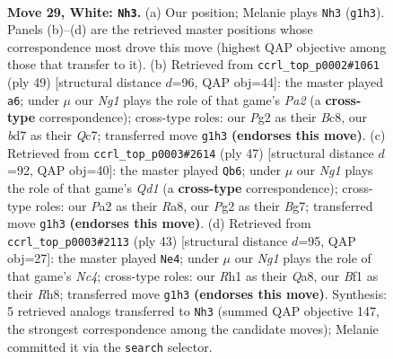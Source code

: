 \documentclass[11pt]{article}
\begin{document}
\clearpage

\begin{figure}[p]\centering
\begin{subfigure}{0.46\textwidth}\centering
\resizebox{\linewidth}{!}{%
\newchessgame
\chessboard[
  setfen={1n3rk1/3b1ppp/8/4Pp2/p4P2/2q5/P1P2KPP/1Q3BNR w - - 0 29},
  showmover=false,
  pgfstyle=straightmove, color=movearrow, markmove={g1-h3}
]}
\caption{}
\end{subfigure}\hfill
\begin{subfigure}{0.46\textwidth}\centering
\resizebox{\linewidth}{!}{%
\newchessgame
\chessboard[
  setfen={1kb4r/ppq5/7p/n2B1p2/3Np3/8/PP2QPPP/3R2K1 b - - 1 25},
  showmover=false,
  pgfstyle=straightmove, color=movearrow, markmove={a7-a6}
]}
\caption{}
\end{subfigure}
\\[4pt]
\begin{subfigure}{0.46\textwidth}\centering
\resizebox{\linewidth}{!}{%
\newchessgame
\chessboard[
  setfen={r2q2k1/p4pb1/4b1pp/1PQ5/P2p4/5N2/3B1PPP/2R3K1 b - - 1 24},
  showmover=false,
  pgfstyle=straightmove, color=movearrow, markmove={d8-b6}
]}
\caption{}
\end{subfigure}\hfill
\begin{subfigure}{0.46\textwidth}\centering
\resizebox{\linewidth}{!}{%
\newchessgame
\chessboard[
  setfen={q3k2r/5p2/7p/1pnpP1p1/2p2P2/2P3B1/6PP/3Q1RK1 b k - 0 22},
  showmover=false,
  pgfstyle=straightmove, color=movearrow, markmove={c5-e4}
]}
\caption{}
\end{subfigure}
\caption{\textbf{Move 29, White: \texttt{Nh3}.} (a) Our position; Melanie plays \texttt{Nh3} (\texttt{g1h3}). Panels (b)--(d) are the retrieved master positions whose correspondence most drove this move (highest QAP objective among those that transfer to it). (b) Retrieved from \texttt{ccrl\_top\_p0002\#1061} (ply 49) [structural distance $d$=96, QAP obj=44]: the master played \texttt{a6}; under $\mu$ our \emph{Ng1} plays the role of that game's \emph{Pa2} (a \textbf{cross-type} correspondence); cross-type roles: our \emph{P}g2 as their \emph{B}c8, our \emph{b}d7 as their \emph{Q}c7; transferred move \texttt{g1h3} \textbf{(endorses this move)}. (c) Retrieved from \texttt{ccrl\_top\_p0003\#2614} (ply 47) [structural distance $d$=92, QAP obj=40]: the master played \texttt{Qb6}; under $\mu$ our \emph{Ng1} plays the role of that game's \emph{Qd1} (a \textbf{cross-type} correspondence); cross-type roles: our \emph{P}a2 as their \emph{R}a8, our \emph{P}g2 as their \emph{B}g7; transferred move \texttt{g1h3} \textbf{(endorses this move)}. (d) Retrieved from \texttt{ccrl\_top\_p0003\#2113} (ply 43) [structural distance $d$=95, QAP obj=27]: the master played \texttt{Ne4}; under $\mu$ our \emph{Ng1} plays the role of that game's \emph{Nc4}; cross-type roles: our \emph{R}h1 as their \emph{Q}a8, our \emph{B}f1 as their \emph{R}h8; transferred move \texttt{g1h3} \textbf{(endorses this move)}. Synthesis: 5 retrieved analogs transferred to \texttt{Nh3} (summed QAP objective 147, the strongest correspondence among the candidate moves); Melanie committed it via the \texttt{search} selector.}
\label{fig:thought-m56}
\end{figure}
\end{document}
